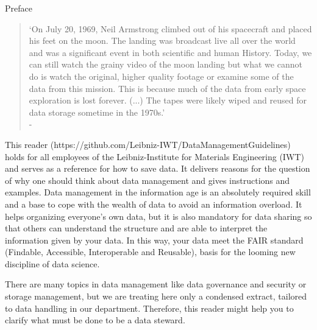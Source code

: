 \thispagestyle{empty}
\begin{center}
  \large\headerfont{}\textcolor{iwtdark}{Preface}
\end{center}

\begin{quote}
  `On July 20, 1969, Neil Armstrong climbed out of his spacecraft and
  placed his feet on the moon. The landing was broadcast live all over the
  world and was a significant event in both scientific and human History.
  Today, we can still watch the grainy video of the moon landing but what we
  cannot do is watch the original, higher quality footage or examine some of
  the data from this mission. This is because much of the data from early space
  exploration is lost forever. (...) The tapes were likely wiped and reused for
  data storage sometime in the 1970s.' \\
  \null\hfill - \citeauthor{briney2015}\cite{briney2015}
\end{quote}

\noindent This reader (https://github.com/Leibniz-IWT/DataManagementGuidelines) holds for all employees of the Leibniz-Institute for Materials Engineering (IWT) and serves as a reference
for how to save data. It delivers reasons for the question of why one should
think about data management and gives instructions and examples. Data management
in the information age is an absolutely required skill and a base to cope with
the wealth of data to avoid an information overload. It helps organizing
everyone’s own data, but it is also mandatory for data sharing so that others
can understand the structure and are able to interpret the information given by
your data. In this way, your data meet the FAIR standard (Findable, Accessible,
Interoperable and Reusable), basis for the looming new discipline of data science.

There are many topics in data management like data governance and security or
storage management, but we are treating here only a condensed extract, tailored
to data handling in our department. Therefore, this reader might help you to
clarify what must be done to be a data steward.
